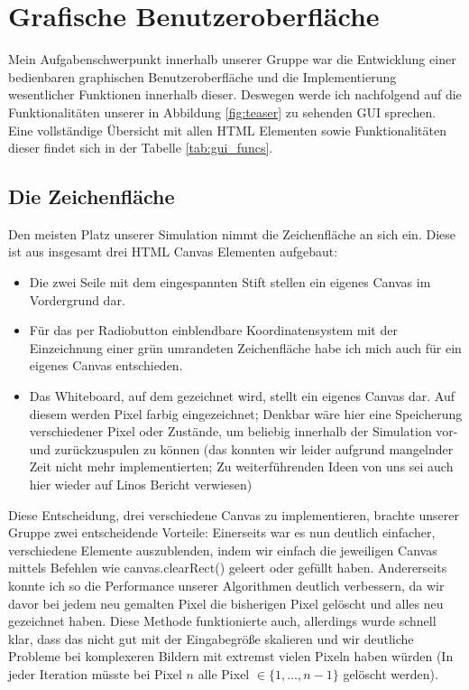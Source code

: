 \section{Grafische Benutzeroberfläche}
\label{sec:gui}
Mein Aufgabenschwerpunkt innerhalb unserer Gruppe war die Entwicklung einer bedienbaren graphischen Benutzeroberfläche und die Implementierung wesentlicher Funktionen innerhalb dieser. Deswegen werde ich nachfolgend auf die Funktionalitäten unserer in Abbildung \ref{fig:teaser} zu sehenden GUI sprechen. Eine vollständige Übersicht mit allen HTML Elementen sowie Funktionalitäten dieser findet sich in der Tabelle \ref{tab:gui_funcs}. \\

\subsection{Die Zeichenfläche}
Den meisten Platz unserer Simulation nimmt die Zeichenfläche an sich ein. Diese ist aus insgesamt drei HTML Canvas Elementen aufgebaut: \\

\begin{itemize}
\item Die zwei Seile mit dem eingespannten Stift stellen ein eigenes Canvas im \glqq{}Vordergrund\grqq{} dar.
\item Für das per Radiobutton einblendbare Koordinatensystem mit der Einzeichnung einer grün umrandeten Zeichenfläche habe ich mich auch für ein eigenes Canvas entschieden. 
\item Das Whiteboard, auf dem gezeichnet  wird, stellt ein eigenes Canvas dar. Auf diesem werden Pixel farbig eingezeichnet; Denkbar wäre hier eine Speicherung verschiedener Pixel oder Zustände, um beliebig innerhalb der Simulation vor- und zurückzuspulen zu können (das konnten wir leider aufgrund mangelnder Zeit nicht mehr implementierten; Zu weiterführenden Ideen von uns sei auch hier wieder auf Linos Bericht verwiesen)
\end{itemize}

Diese Entscheidung, drei verschiedene Canvas zu implementieren, brachte unserer Gruppe zwei entscheidende Vorteile: Einerseits war es nun deutlich einfacher, verschiedene Elemente auszublenden, indem wir einfach die jeweiligen Canvas mittels Befehlen wie \glqq{}canvas.clearRect()\grqq{} geleert oder gefüllt haben. Andererseits konnte ich so die Performance unserer Algorithmen deutlich verbessern, da wir davor bei jedem neu gemalten Pixel die bisherigen Pixel gelöscht und alles neu gezeichnet haben. Diese Methode funktionierte auch, allerdings wurde schnell klar, dass das nicht gut mit der Eingabegröße skalieren und wir deutliche Probleme bei komplexeren Bildern mit extremst vielen Pixeln haben würden (In jeder Iteration müsste bei Pixel $n$ alle Pixel $\in \{1,...,n-1\}$ gelöscht werden).


